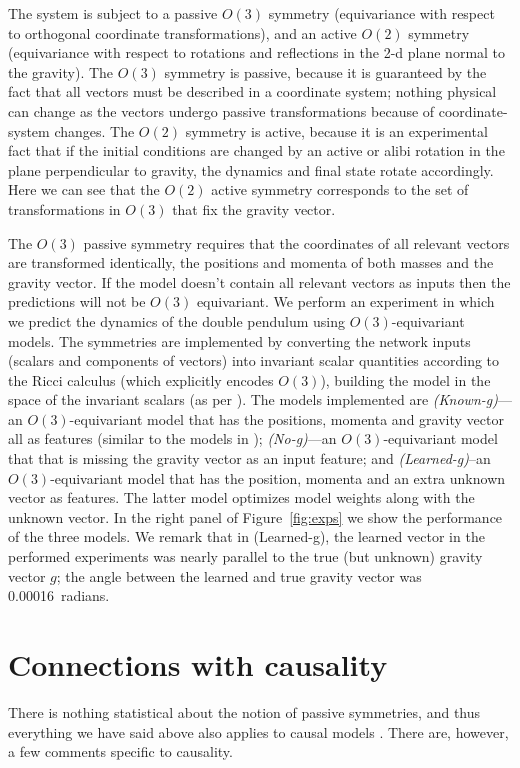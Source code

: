 \documentclass[preprint]{article} %
\newcommand{\figref}[1]{Figure~\ref{#1}}
\newcommand{\bernhard}[1]{\textcolor{red}{\textbf{BS says: #1}}}
\begin{document}
The system is subject to a passive $O(3)$ symmetry (equivariance with respect to orthogonal coordinate transformations), and an active $O(2)$ symmetry (equivariance with respect to rotations and reflections in the 2-d plane normal to the gravity). 
The $O(3)$ symmetry is passive, because it is guaranteed by the fact that all vectors must be described in a coordinate system; nothing physical can change as the vectors undergo passive transformations because of coordinate-system changes.
The $O(2)$ symmetry is active, because it is an experimental fact that if the initial conditions are changed by an active or alibi rotation in the plane perpendicular to gravity, the dynamics and final state rotate accordingly.
Here we can see that the $O(2)$ active symmetry corresponds to the set of transformations in $O(3)$ that fix the gravity vector. 

The $O(3)$ passive symmetry requires that the coordinates of all relevant vectors are transformed identically, the positions and momenta of both masses and the gravity vector. If the model doesn't contain all relevant vectors as inputs then the predictions will not be $O(3)$ equivariant. We perform an experiment in which we predict the dynamics of the double pendulum using $O(3)$-equivariant models. The symmetries are implemented by converting the network inputs (scalars and components of vectors) into invariant scalar quantities according to the Ricci calculus (which explicitly encodes $O(3)$), building the model in the space of the invariant scalars (as per \citealt{villar2021scalars}). The models implemented are \textsl{(Known-g)}---an $O(3)$-equivariant model that has the positions, momenta and gravity vector all as features (similar to the models in \citealt{villar2021scalars, yao2021simple}); \textsl{(No-g)}---an $O(3)$-equivariant model that that is missing the gravity vector as an input feature; and \textsl{(Learned-g)}\---an $O(3)$-equivariant model that has the position, momenta and an extra unknown vector as features. The latter model optimizes model weights along with the unknown vector. 
In the right panel of \figref{fig:exps} we show the performance of the three models.
We remark that in (Learned-g), the learned vector in the performed experiments was nearly parallel to the true (but unknown) gravity vector $g$; the angle between the learned and true gravity vector was 0.00016~radians.

\section{Connections with causality}\label{sec:causality}
There is nothing statistical about the notion of passive symmetries, and thus everything we have said above also applies to causal models \citep{PetJanSch17}. There are, however, a few comments specific to causality.
\end{document}
